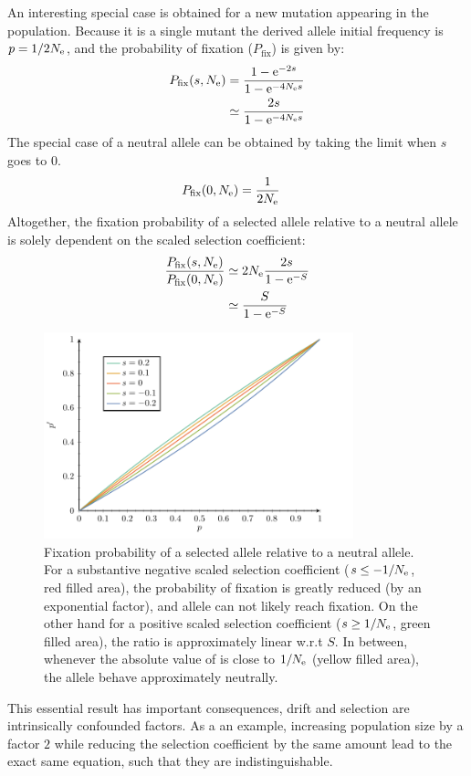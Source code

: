 An interesting special case is obtained for a new mutation appearing in the population.
Because it is a single mutant the derived \gls{allele} initial frequency is $p = 1 / 2 N_{\textrm{e}}$, and the probability of fixation ($P_{\mathrm{fix}}$) is given by:
\begin{align}
	P_{\mathrm{fix}}(s, N_{\textrm{e}}) & = \dfrac{1 - \mathrm{e}^{-2 s}}{1 - \mathrm{e}^{-4 N_{\textrm{e}} s}} \\
	 & \simeq  \dfrac{2 s }{1 - \mathrm{e}^{-4 N_{\textrm{e}} s}}
\end{align}
The special case of a \gls{neutral} \gls{allele} can be obtained by taking the limit when $s$ goes to $0$.
\begin{align}
P_{\mathrm{fix}}(0, N_{\textrm{e}}) & = \dfrac{1}{2 N_{\textrm{e}}}
\end{align}
Altogether, the fixation probability of a selected \gls{allele} relative to a \gls{neutral} \gls{allele} is solely dependent on the scaled selection coefficient:
\begin{align}
\dfrac{P_{\mathrm{fix}}(s, N_{\textrm{e}})}{P_{\mathrm{fix}}(0, N_{\textrm{e}})} & \simeq 2 N_{\textrm{e}} \dfrac{2s}{1 - \mathrm{e}^{-S}} \\
& \simeq  \dfrac{S}{1 - \mathrm{e}^{-S}} \label{eq:p-fix}
\end{align}
\begin{figure}[H]
	\centering
	\includegraphics[width=0.8\textwidth, page=2] {figures.pdf}
	\caption[Relative fixation probability]{Fixation probability of a selected \gls{allele} relative to a \gls{neutral} \gls{allele}.
	For a substantive negative scaled selection coefficient ($s \leq -1/N_{\textrm{e}}$, red filled area), the probability of fixation is greatly reduced (by an exponential factor), and \gls{allele} can not likely reach fixation. On the other hand for a positive scaled selection coefficient ($s \geq 1 / N_{\textrm{e}}$, green filled area), the ratio is approximately linear w.r.t $S$. In between, whenever the absolute value of is close to $1 / N_{\textrm{e}}$ (yellow filled area), the \gls{allele} behave approximately neutrally.}
\end{figure}
This essential result has important consequences, \gls{drift} and selection are intrinsically confounded factors.
As a an example, increasing population size by a factor $2$ while reducing the selection coefficient by the same amount lead to the exact same equation, such that they are indistinguishable.

